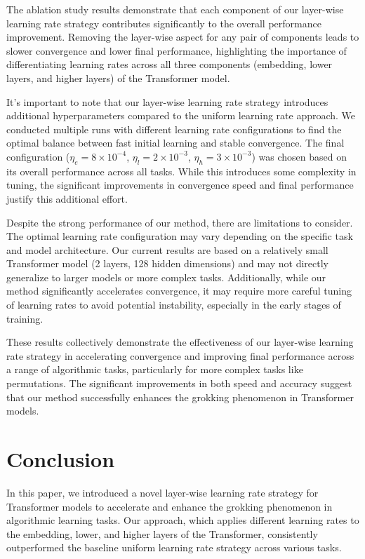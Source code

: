 \documentclass{article} %
\begin{document}
The ablation study results demonstrate that each component of our layer-wise learning rate strategy contributes significantly to the overall performance improvement. Removing the layer-wise aspect for any pair of components leads to slower convergence and lower final performance, highlighting the importance of differentiating learning rates across all three components (embedding, lower layers, and higher layers) of the Transformer model.

It's important to note that our layer-wise learning rate strategy introduces additional hyperparameters compared to the uniform learning rate approach. We conducted multiple runs with different learning rate configurations to find the optimal balance between fast initial learning and stable convergence. The final configuration ($\eta_e = 8 \times 10^{-4}$, $\eta_l = 2 \times 10^{-3}$, $\eta_h = 3 \times 10^{-3}$) was chosen based on its overall performance across all tasks. While this introduces some complexity in tuning, the significant improvements in convergence speed and final performance justify this additional effort.

Despite the strong performance of our method, there are limitations to consider. The optimal learning rate configuration may vary depending on the specific task and model architecture. Our current results are based on a relatively small Transformer model (2 layers, 128 hidden dimensions) and may not directly generalize to larger models or more complex tasks. Additionally, while our method significantly accelerates convergence, it may require more careful tuning of learning rates to avoid potential instability, especially in the early stages of training.

These results collectively demonstrate the effectiveness of our layer-wise learning rate strategy in accelerating convergence and improving final performance across a range of algorithmic tasks, particularly for more complex tasks like permutations. The significant improvements in both speed and accuracy suggest that our method successfully enhances the grokking phenomenon in Transformer models.

\section{Conclusion}
\label{sec:conclusion}

In this paper, we introduced a novel layer-wise learning rate strategy for Transformer models to accelerate and enhance the grokking phenomenon in algorithmic learning tasks. Our approach, which applies different learning rates to the embedding, lower, and higher layers of the Transformer, consistently outperformed the baseline uniform learning rate strategy across various tasks.
\end{document}

